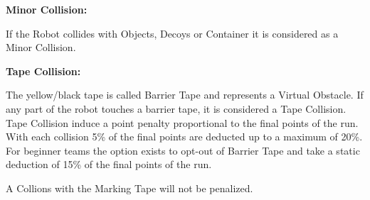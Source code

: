 \textbf{Minor Collision:}

If the Robot collides with Objects, Decoys or Container it is considered as a Minor Collision. 


\textbf{Tape Collision:}

The yellow/black tape is called Barrier Tape and represents a Virtual Obstacle. If any part of the robot
touches a barrier tape, it is considered a Tape Collision. Tape Collision induce a point penalty
proportional to the final points of the run. With each collision 5\% of the final points are deducted up to a maximum
of 20\%. For beginner teams the option exists to opt-out of Barrier Tape and take a static deduction of 15\% of the
final points of the run.

A Collions with the Marking Tape will not be penalized.


